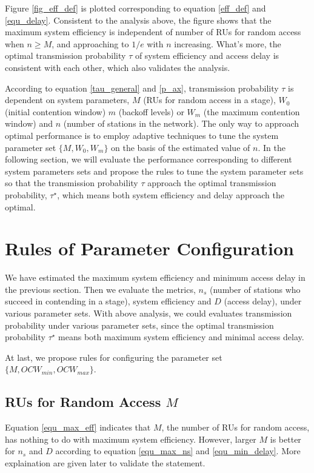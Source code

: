 Figure \ref{fig_eff_def} is plotted corresponding to equation \ref{eff_def} and \ref{equ_delay}.
Consistent to the analysis above, the figure shows that the maximum system efficiency is independent of number of RUs for random access when $n\geq M$, and approaching to $1/e$ with $n$ increasing. 
What's more, the optimal transmission probability $\tau$ of system efficiency and access delay is consistent with each other, which also validates the analysis. 

According to equation \ref{tau_general} and \ref{p_ax}, transmission probability $\tau$ is dependent on system parameters, $M$ (RUs for random access in a stage), $W_0$ (initial contention window) $m$ (backoff levels) or $W_m$ (the maximum contention window) and $n$ (number of stations in the network).
The only way to approach optimal performance is to employ adaptive techniques to tune the system parameter set $\lbrace M, W_0, W_m \rbrace$ on the basis of the estimated value of $n$.
In the following section, we will evaluate the performance corresponding to different system parameters sets and propose the rules to tune the system parameter sets so that the transmission probability $\tau$ approach the optimal transmission probability, $\tau^\star$, which means both system efficiency and delay approach the optimal. 

\section{Rules of Parameter Configuration} 	\label{sec_perf_eval}
We have estimated the maximum system efficiency and minimum access delay in the previous section. Then we evaluate the metrics, $n_s$ (number of stations who succeed in contending in a stage), system efficiency and $D$ (access delay), under various parameter sets. 
With above analysis, we could evaluates transmission probability under various parameter sets, since the optimal transmission probability $\tau^\star$ means both maximum system efficiency and minimal access delay.

At last, we propose rules for configuring the parameter set $\lbrace M, OCW_{min}, OCW_{max}\rbrace$.

\subsection{RUs for Random Access $M$}
\label{M}
Equation \ref{equ_max_eff} indicates that $M$, the number of RUs for random access, has nothing to do with maximum system efficiency. 
However, larger $M$ is better for $n_s$ and $D$ according to equation \ref{equ_max_ns} and \ref{equ_min_delay}. More explaination are given later to validate the statement. 

